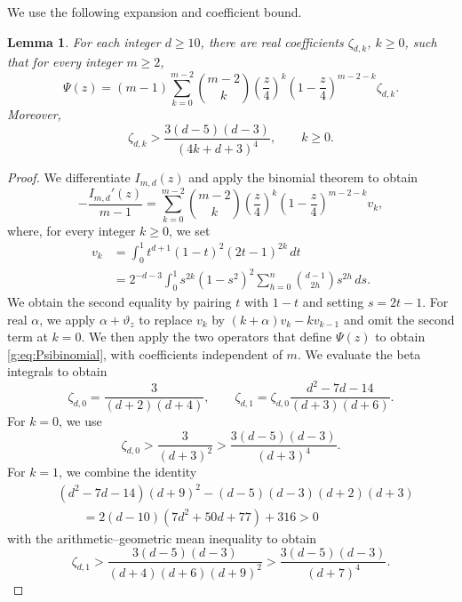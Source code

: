 \documentclass[11pt]{article}
\numberwithin{equation}{section}
\newtheorem{lemma}[theorem]{Lemma}
\theoremstyle{remark}\newtheorem{remark}[theorem]{Remark}
\begin{document}
We use the following expansion and coefficient bound.
\begin{lemma}\label{g:lem:coefflower}
For each integer $d\ge10$, there are real coefficients $\zeta_{d,k}$,
$k\ge0$, such that for every integer $m\ge2$,
\begin{equation}\label{g:eq:Psibinomial}
 \Psi(z)=(m-1)\sum_{k=0}^{m-2}\binom{m-2}{k}
 \left(\frac z4\right)^k\left(1-\frac z4\right)^{m-2-k}\zeta_{d,k}.
\end{equation}
Moreover,
\[
 \zeta_{d,k}>\frac{3(d-5)(d-3)}{(4k+d+3)^4},\qquad k\ge0.
\]
\end{lemma}
\begin{proof}
We differentiate $I_{m,d}(z)$ and apply the binomial theorem to obtain
\[
 -\frac{I_{m,d}'(z)}{m-1}
 =\sum_{k=0}^{m-2}\binom{m-2}{k}
 \left(\frac z4\right)^k\left(1-\frac z4\right)^{m-2-k}v_k,
\]
where, for every integer $k\ge0$, we set
\[
\begin{aligned}
 v_k&=\int_0^1t^{d+1}(1-t)^2(2t-1)^{2k}\,dt\\
 &=2^{-d-3}\int_0^1s^{2k}(1-s^2)^2
 \sum_{h=0}^{n}\binom{d-1}{2h}s^{2h}\,ds.
\end{aligned}
\]
We obtain the second equality by pairing $t$ with $1-t$ and setting $s=2t-1$.
For real $\alpha$, we apply $\alpha+\vartheta_z$ to replace $v_k$ by
$(k+\alpha)v_k-kv_{k-1}$ and omit the second term at $k=0$.
We then apply the two operators that define $\Psi(z)$ to obtain
\eqref{g:eq:Psibinomial}, with coefficients independent of $m$.
We evaluate the beta integrals to obtain
\[
 \zeta_{d,0}=\frac{3}{(d+2)(d+4)},\qquad
 \zeta_{d,1}=\zeta_{d,0}\frac{d^2-7d-14}{(d+3)(d+6)}.
\]
For $k=0$, we use
\[
 \zeta_{d,0}>\frac{3}{(d+3)^2}
 >\frac{3(d-5)(d-3)}{(d+3)^4}.
\] For $k=1$, we combine the identity
\[
\begin{aligned}
 &(d^2-7d-14)(d+9)^2-(d-5)(d-3)(d+2)(d+3)\\
 &\qquad=2(d-10)(7d^2+50d+77)+316>0
\end{aligned}
\]
with the arithmetic--geometric mean inequality to obtain
\[
 \zeta_{d,1}>
 \frac{3(d-5)(d-3)}{(d+4)(d+6)(d+9)^2}
 >\frac{3(d-5)(d-3)}{(d+7)^4}.
\]


\end{proof}
\end{document}
